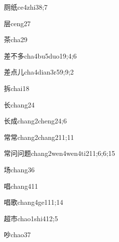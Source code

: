 \begin{verbete}{厕纸}{ce4zhi3}{8;7}
\end{verbete}
\begin{verbete}{层}{ceng2}{7}
\end{verbete}
\begin{verbete}{茶}{cha2}{9}
\end{verbete}
\begin{verbete}{差不多}{cha4bu5duo1}{9;4;6}
\end{verbete}
\begin{verbete}{差点儿}{cha4dian3r5}{9;9;2}
\end{verbete}
\begin{verbete}{拆}{chai1}{8}
\end{verbete}
\begin{verbete}{长}{chang2}{4}
\end{verbete}
\begin{verbete}{长成}{chang2cheng2}{4;6}
\end{verbete}
\begin{verbete}{常常}{chang2chang2}{11;11}
\end{verbete}
\begin{verbete}{常问问题}{chang2wen4wen4ti2}{11;6;6;15}
\end{verbete}
\begin{verbete}{场}{chang3}{6}
\end{verbete}
\begin{verbete}{唱}{chang4}{11}
\end{verbete}
\begin{verbete}{唱歌}{chang4ge1}{11;14}
\end{verbete}
\begin{verbete}{超市}{chao1shi4}{12;5}
\end{verbete}
\begin{verbete}{吵}{chao3}{7}
\end{verbete}
